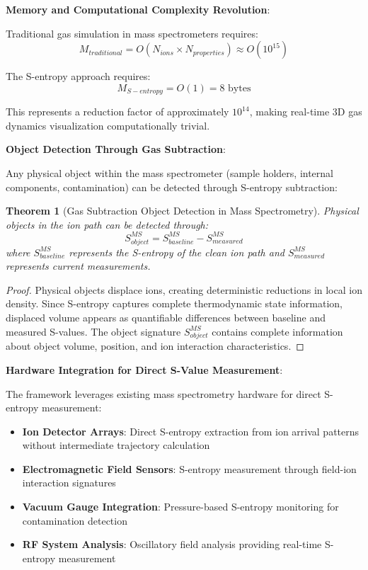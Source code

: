 \documentclass[11pt,a4paper]{article}
\newtheorem{theorem}{Theorem}[section]
\theoremstyle{remark}
\begin{document}
\textbf{Memory and Computational Complexity Revolution}:

Traditional gas simulation in mass spectrometers requires:
$$M_{traditional} = O(N_{ions} \times N_{properties}) \approx O(10^{15})$$

The S-entropy approach requires:
$$M_{S-entropy} = O(1) = 8 \text{ bytes}$$

This represents a reduction factor of approximately $10^{14}$, making real-time 3D gas dynamics visualization computationally trivial.

\textbf{Object Detection Through Gas Subtraction}:

Any physical object within the mass spectrometer (sample holders, internal components, contamination) can be detected through S-entropy subtraction:

\begin{theorem}[Gas Subtraction Object Detection in Mass Spectrometry]
Physical objects in the ion path can be detected through:
$$S_{object}^{MS} = S_{baseline}^{MS} - S_{measured}^{MS}$$
where $S_{baseline}^{MS}$ represents the S-entropy of the clean ion path and $S_{measured}^{MS}$ represents current measurements.
\end{theorem}

\begin{proof}
Physical objects displace ions, creating deterministic reductions in local ion density. Since S-entropy captures complete thermodynamic state information, displaced volume appears as quantifiable differences between baseline and measured S-values. The object signature $S_{object}^{MS}$ contains complete information about object volume, position, and ion interaction characteristics.
\end{proof}

\textbf{Hardware Integration for Direct S-Value Measurement}:

The framework leverages existing mass spectrometry hardware for direct S-entropy measurement:

\begin{itemize}
\item \textbf{Ion Detector Arrays}: Direct S-entropy extraction from ion arrival patterns without intermediate trajectory calculation
\item \textbf{Electromagnetic Field Sensors}: S-entropy measurement through field-ion interaction signatures 
\item \textbf{Vacuum Gauge Integration}: Pressure-based S-entropy monitoring for contamination detection
\item \textbf{RF System Analysis}: Oscillatory field analysis providing real-time S-entropy measurement
\end{itemize}
\end{document}
